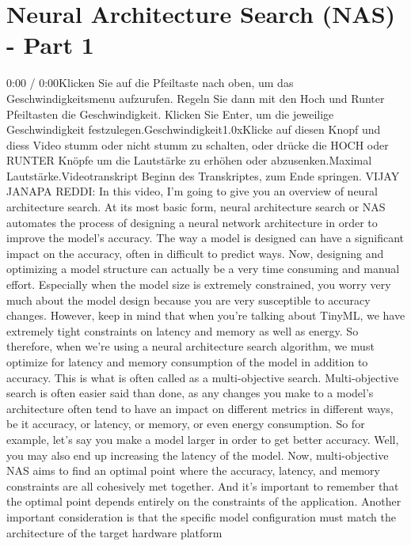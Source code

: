 {{{{ 
\section{Neural Architecture Search (NAS) - Part 1}

    0:00 / 0:00Klicken Sie auf die Pfeiltaste nach oben, um das Geschwindigkeitsmenu aufzurufen. Regeln Sie dann mit den Hoch und Runter Pfeiltasten die Geschwindigkeit. Klicken Sie Enter, um die jeweilige Geschwindigkeit festzulegen.Geschwindigkeit1.0xKlicke auf diesen Knopf und diess Video stumm oder nicht stumm zu schalten, oder drücke die HOCH oder RUNTER Knöpfe um die Lautstärke zu erhöhen oder abzusenken.Maximal Lautstärke.Videotranskript
    Beginn des Transkriptes, zum Ende springen.
    VIJAY JANAPA REDDI: In this video, I'm going
    to give you an overview of neural architecture search.
    At its most basic form, neural architecture search or NAS
    automates the process of designing a neural network architecture in order
    to improve the model's accuracy.
    The way a model is designed can have a significant impact
    on the accuracy, often in difficult to predict ways.
    Now, designing and optimizing a model structure
    can actually be a very time consuming and manual effort.
    Especially when the model size is extremely constrained,
    you worry very much about the model design
    because you are very susceptible to accuracy changes.
    However, keep in mind that when you're talking about TinyML,
    we have extremely tight constraints on latency and memory as well as energy.
    So therefore, when we're using a neural architecture search algorithm,
    we must optimize for latency and memory consumption of the model in addition
    to accuracy.
    This is what is often called as a multi-objective search.
    Multi-objective search is often easier said than done,
    as any changes you make to a model's architecture
    often tend to have an impact on different metrics in different ways,
    be it accuracy, or latency, or memory, or even energy consumption.
    So for example, let's say you make a model larger
    in order to get better accuracy.
    Well, you may also end up increasing the latency of the model.
    Now, multi-objective NAS aims to find an optimal point
    where the accuracy, latency, and memory constraints
    are all cohesively met together.
    And it's important to remember that the optimal point depends entirely
    on the constraints of the application.
    Another important consideration is that the specific model configuration
    must match the architecture of the target hardware platform
}}}}
